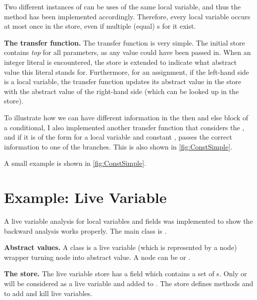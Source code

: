 Two different instances of  can be uses of the
same local variable, and thus the  method has been
implemented accordingly. Therefore, every local variable occurs at
most once in the store, even if multiple (equal)
s for it exist.

\textbf{The transfer function.} The transfer function is very
simple. The initial store contains \emph{top} for all parameters, as
any value could have been passed in.  When an integer literal is
encountered, the store is extended to indicate what abstract value
this literal stands for. Furthermore, for an assignment, if the
left-hand side is a local variable, the transfer function updates its
abstract value in the store with the abstract value of the right-hand
side (which can be looked up in the store).

To illustrate how we can have different information in the then and
else block of a conditional, I also implemented another transfer
function that considers the , and if it is of the
form  for a local variable  and constant
, passes the correct information to one of the branches. This
is also shown in \autoref{fig:ConstSimple}.

 A small example is shown in \autoref{fig:ConstSimple}.



\section{Example: Live Variable}

A live variable analysis for local variables and fields was implemented
to show the backward analysis works properly. The main class is
.

\textbf{Abstract values.} A class  is a live
variable (which is represented by a node) wrapper turning node into
abstract value. A node can be  or .

\textbf{The store.} The live variable store  has a field
 which contains a set of s. Only
 or  will be considered as a
live variable and added to . The store defines methods
 and  to add
and kill live variables.

